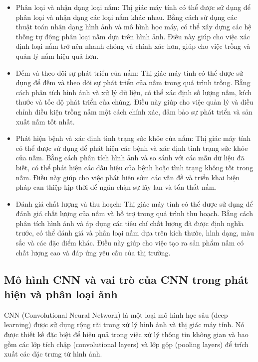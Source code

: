 \begin{itemize}
    \item Phân loại và nhận dạng loại nấm: Thị giác máy tính có thể được sử dụng để phân loại và nhận dạng các loại nấm khác nhau. Bằng cách sử dụng các thuật toán nhận dạng hình ảnh và mô hình học máy, có thể xây dựng các hệ thống tự động phân loại nấm dựa trên hình ảnh. Điều này giúp cho việc xác định loại nấm trở nên nhanh chóng và chính xác hơn, giúp cho việc trồng và quản lý nấm hiệu quả hơn.
    \item Đếm và theo dõi sự phát triển của nấm: Thị giác máy tính có thể được sử dụng để đếm và theo dõi sự phát triển của nấm trong quá trình trồng. Bằng cách phân tích hình ảnh và xử lý dữ liệu, có thể xác định số lượng nấm, kích thước và tốc độ phát triển của chúng. Điều này giúp cho việc quản lý và điều chỉnh điều kiện trồng nấm một cách chính xác, đảm bảo sự phát triển và sản xuất nấm tốt nhất.
    \item Phát hiện bệnh và xác định tình trạng sức khỏe của nấm: Thị giác máy tính có thể được sử dụng để phát hiện các bệnh và xác định tình trạng sức khỏe của nấm. Bằng cách phân tích hình ảnh và so sánh với các mẫu dữ liệu đã biết, có thể phát hiện các dấu hiệu của bệnh hoặc tình trạng không tốt trong nấm. Điều này giúp cho việc phát hiện sớm các vấn đề và triển khai biện pháp can thiệp kịp thời để ngăn chặn sự lây lan và tổn thất nấm.
    \item Đánh giá chất lượng và thu hoạch: Thị giác máy tính có thể được sử dụng để đánh giá chất lượng của nấm và hỗ trợ trong quá trình thu hoạch. Bằng cách phân tích hình ảnh và áp dụng các tiêu chí chất lượng đã được định nghĩa trước, có thể đánh giá và phân loại nấm dựa trên kích thước, hình dạng, màu sắc và các đặc điểm khác. Điều này giúp cho việc tạo ra sản phẩm nấm có chất lượng cao và đáp ứng yêu cầu của thị trường.
\end{itemize}


\subsection{Mô hình CNN và vai trò của CNN trong phát hiện và phân loại ảnh}

CNN (Convolutional Neural Network) là một loại mô hình học sâu (deep learning) được sử dụng rộng rãi trong xử lý hình ảnh và thị giác máy tính. Nó được thiết kế đặc biệt để hiệu quả trong việc xử lý thông tin không gian và bao gồm các lớp tích chập (convolutional layers) và lớp gộp (pooling layers) để trích xuất các đặc trưng từ hình ảnh.

